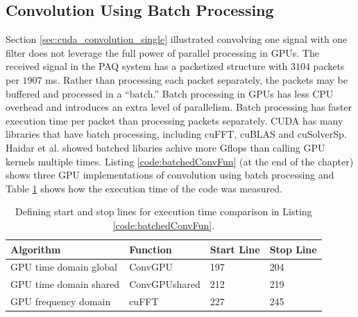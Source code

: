 \subsection{Convolution Using Batch Processing}
\label{sec:batched_convolution}
Section \ref{sec:cuda_convolution_single} illustrated convolving one signal with one filter does not leverage the full power of parallel processing in GPUs.
The received signal in the PAQ system has a packetized structure with $3104$ packets per $1907$ ms.
Rather than processing each packet separately, the packets may be buffered and processed in a ``batch.''
Batch processing in GPUs has less CPU overhead and introduces an extra level of parallelism.
Batch processing has faster execution time per packet than processing packets separately.
CUDA has many libraries that have batch processing, including cuFFT, cuBLAS and cuSolverSp.
Haidar et al. \cite{haidar2015optimization} showed batched libaries achive more Gflops than calling GPU kernels multiple times.
Listing \ref{code:batchedConvFun} (at the end of the chapter) shows three GPU implementations of convolution using batch processing and Table \ref{tab:BatchedGPUtimingTable} shows how the execution time of the code was measured.
\begin{table}
\caption{Defining start and stop lines for execution time comparison in Listing \ref{code:batchedConvFun}.}
\begin{center}
\begin{tabular}{llll}
	\toprule
	Algorithm 				& Function		& Start Line	& Stop  Line		\\ \midrule
	GPU time domain global 	& ConvGPU 		& 197			& 204				\\
	GPU time domain shared 	& ConvGPUshared & 212			& 219				\\
	GPU frequency domain 	& cuFFT			& 227			& 245				\\ 
	\bottomrule
\end{tabular}
\end{center}
\label{tab:BatchedGPUtimingTable}
\end{table}

